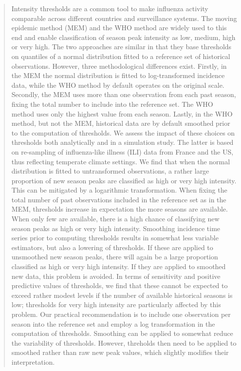 \documentclass{article}
\begin{document}
{\begin{quote}
\footnotesize Intensity thresholds are a common tool to make influenza activity comparable across different countries and surveillance systems. The moving epidemic method (MEM) and the WHO method are widely used to this end and enable classification of season peak intensity as low, medium, high or very high. The two approaches are similar in that they base thresholds on quantiles of a normal distribution fitted to a reference set of historical observations. However, three methodological differences exist. Firstly, in the MEM the normal distribution is fitted to log-transformed incidence data, while the WHO method by default operates on the original scale. Secondly, the MEM uses more than one observation from each past season, fixing the total number to include into the reference set. The WHO method uses only the highest value from each season. Lastly, in the WHO method, but not the MEM, historical data are by default  smoothed prior to the computation of thresholds. We assess the impact of these choices on thresholds both analytically and in a simulation study. The latter is based on re-sampling of influenza-like illness (ILI) data from France and the US, thus reflecting temperate climate settings. We find that when the normal distribution is fitted to untransformed observations, a rather large proportion of new season peaks are classified as high or very high intensity. This can be mitigated by a logarithmic transformation. When fixing the total number of past observations included in the reference set as in the MEM, thresholds increase in expectation the more seasons are available. When only few are available, there is a high chance of classifying new season peaks as high or very high intensity. Smoothing incidence time series prior to computing thresholds results in somewhat less variable estimators, but also a lowering of thresholds. If these are applied to unsmoothed new season peaks, there will again be a large proportion classified as high or very high intensity. If they are applied to smoothed new data, this problem is avoided. In terms of sensitivity and positive predictive values of thresholds, we find that these cannot be expected to exceed rather modest levels if the number of available historical seasons is low; thresholds for very high intensity are particularly affected by this problem. Our practical recommendation is to include one observation per season into the reference set and employ a log transformation in the computation of thresholds. Smoothing can be applied to somewhat reduce the variability of thresholds. However, threholds then need to be applied to smoothed rather than raw new peak values, which slightly modifies their interpretation.
\end{quote}}
\end{document}
